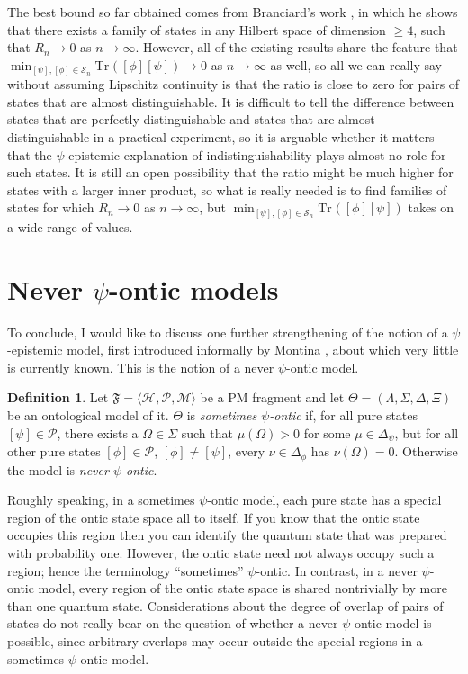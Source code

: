 \documentclass[DIV=calc,paper=a4,fontsize=11pt,twocolumn]{scrartcl} %
\theoremstyle{definition}
\newtheorem{definition}{Definition}[section]
\theoremstyle{plain}
\newcommand{\Proj}[1]{\ensuremath{\left [ #1 \right ]}}
\newcommand{\Hilb}[1][]{\ensuremath{\mathcal{H}_{#1}}}
\newcommand{\Tr}[2][]{\ensuremath{\text{Tr}_{#1} \left ( #2 \right )}}
\begin{document}
The best bound so far obtained comes from Branciard's work
\cite{Branciard2014}, in which he shows that there exists a family of
states in any Hilbert space of dimension $\geq 4$, such that $R_n
\rightarrow 0$ as $n \rightarrow \infty$.  However, all of the
existing results share the feature that $\min_{\Proj{\psi},\Proj{\phi}
\in \mathcal{S}_n} \Tr{\Proj{\phi}\Proj{\psi}} \rightarrow 0$ as $n
\rightarrow \infty$ as well, so all we can really say without assuming
Lipschitz continuity is that the ratio is close to zero for pairs of
states that are almost distinguishable.  It is difficult to tell the
difference between states that are perfectly distinguishable and
states that are almost distinguishable in a practical experiment, so
it is arguable whether it matters that the $\psi$-epistemic
explanation of indistinguishability plays almost no role for such
states.  It is still an open possibility that the ratio might be much
higher for states with a larger inner product, so what is really
needed is to find families of states for which $R_n \rightarrow 0$ as
$n \rightarrow \infty$, but $\min_{\Proj{\psi},\Proj{\phi} \in
\mathcal{S}_n}\Tr{\Proj{\phi}\Proj{\psi}}$ takes on a wide range of
values.

\section{Never $\psi$-ontic models}

\label{Never}

To conclude, I would like to discuss one further strengthening of the
notion of a $\psi$-epistemic model, first introduced informally by
Montina \cite{Montina2012a}, about which very little is currently
known.  This is the notion of a never $\psi$-ontic model.

\begin{definition}
Let $\mathfrak{F} = \langle \Hilb, \mathcal{P}, \mathcal{M} \rangle$
be a PM fragment and let $\Theta = (\Lambda, \Sigma, \Delta, \Xi)$ be
an ontological model of it.  $\Theta$ is \emph{sometimes $\psi$-ontic}
if, for all pure states $\Proj{\psi} \in \mathcal{P}$, there exists
a $\Omega \in \Sigma$ such that $\mu(\Omega) > 0$ for some $\mu \in
\Delta_{\psi}$, but for all other pure states $\Proj{\phi} \in
\mathcal{P}$, $\Proj{\phi} \neq \Proj{\psi}$, every $\nu \in
\Delta_{\phi}$ has $\nu(\Omega) = 0$.  Otherwise the model is
\emph{never $\psi$-ontic}.
\end{definition}

Roughly speaking, in a sometimes $\psi$-ontic model, each pure state
has a special region of the ontic state space all to itself.  If you
know that the ontic state occupies this region then you can identify
the quantum state that was prepared with probability one.  However,
the ontic state need not always occupy such a region; hence the
terminology ``sometimes'' $\psi$-ontic.  In contrast, in a never
$\psi$-ontic model, every region of the ontic state space is shared
nontrivially by more than one quantum state.  Considerations about the
degree of overlap of pairs of states do not really bear on the
question of whether a never $\psi$-ontic model is possible, since
arbitrary overlaps may occur outside the special regions in a
sometimes $\psi$-ontic model.
\end{document}
